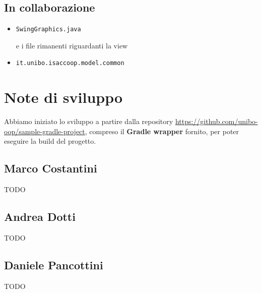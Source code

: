 \documentclass[a4paper,12pt]{report}
\begin{document}
\subsection*{In collaborazione}
\begin{itemize}
    \item \begin{verbatim}SwingGraphics.java\end{verbatim} e i file rimanenti riguardanti la view
    \item \begin{verbatim}it.unibo.isaccoop.model.common \end{verbatim}
\end{itemize}

\section{Note di sviluppo}
Abbiamo iniziato lo sviluppo a partire dalla repository \url{https://github.com/unibo-oop/sample-gradle-project}, compreso il \textbf{Gradle wrapper} fornito, per poter eseguire la build del progetto.
\subsection*{Marco Costantini}
{TODO}

\subsection*{Andrea Dotti}
{TODO}

\subsection*{Daniele Pancottini}
{TODO}
\end{document}
